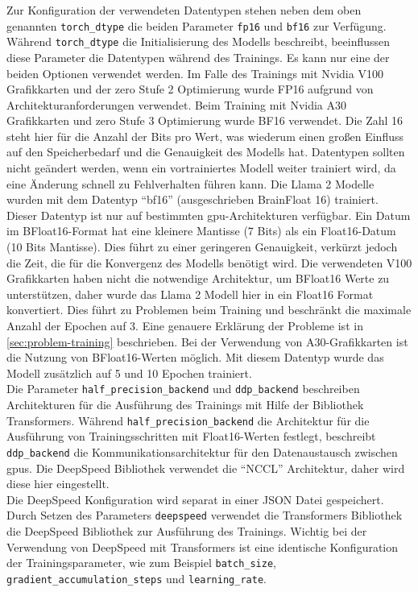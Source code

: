 Zur Konfiguration der verwendeten Datentypen stehen neben dem oben genannten \texttt{torch\_dtype} die beiden Parameter \texttt{fp16} und \texttt{bf16} zur Verfügung. Während \texttt{torch\_dtype} die Initialisierung des Modells beschreibt, beeinflussen diese Parameter die Datentypen während des Trainings.
Es kann nur eine der beiden Optionen verwendet werden. Im Falle des Trainings mit Nvidia V100 Grafikkarten und der \ac{zero} Stufe 2 Optimierung wurde FP16 aufgrund von Architekturanforderungen verwendet. Beim Training mit Nvidia A30 Grafikkarten und \ac{zero} Stufe 3 Optimierung wurde BF16 verwendet.
Die Zahl 16 steht hier für die Anzahl der Bits pro Wert, was wiederum einen großen Einfluss auf den Speicherbedarf und die Genauigkeit des Modells hat.
Datentypen sollten nicht geändert werden, wenn ein vortrainiertes Modell weiter trainiert wird, da eine Änderung schnell zu Fehlverhalten führen kann.
Die Llama 2 Modelle wurden mit dem Datentyp \enquote{bf16} (ausgeschrieben BrainFloat 16) trainiert.
Dieser Datentyp ist nur auf bestimmten \ac{gpu}-Architekturen verfügbar.
Ein Datum im BFloat16-Format hat eine kleinere Mantisse (7 Bits) als ein Float16-Datum (10 Bits Mantisse). Dies führt zu einer geringeren Genauigkeit, verkürzt jedoch die Zeit, die für die Konvergenz des Modells benötigt wird.
Die verwendeten V100 Grafikkarten haben nicht die notwendige Architektur, um BFloat16 Werte zu unterstützen, daher wurde das Llama 2 Modell hier in ein Float16 Format konvertiert.
Dies führt zu Problemen beim Training und beschränkt die maximale Anzahl der Epochen auf 3. Eine genauere Erklärung der Probleme ist in \cref{sec:problem-training} beschrieben.
Bei der Verwendung von A30-Grafikkarten ist die Nutzung von BFloat16-Werten möglich. Mit diesem Datentyp wurde das Modell zusätzlich auf 5 und 10 Epochen trainiert.\\

Die Parameter \texttt{half\_precision\_backend} und \texttt{ddp\_backend} beschreiben Architekturen für die Ausführung des Trainings mit Hilfe der Bibliothek Transformers.
Während \texttt{half\_precision\_backend} die Architektur für die Ausführung von Trainingsschritten mit Float16-Werten festlegt, beschreibt \texttt{ddp\_backend} die Kommunikationsarchitektur für den Datenaustausch zwischen \ac{gpu}s.
Die DeepSpeed Bibliothek verwendet die \enquote{NCCL} Architektur, daher wird diese hier eingestellt.\\

Die DeepSpeed Konfiguration wird separat in einer JSON Datei gespeichert.
Durch Setzen des Parameters \texttt{deepspeed} verwendet die Transformers Bibliothek \citep{transformers} die DeepSpeed Bibliothek \citep{deepspeed} zur Ausführung des Trainings.
Wichtig bei der Verwendung von DeepSpeed mit Transformers ist eine identische Konfiguration der Trainingsparameter, wie zum Beispiel \texttt{batch\_size}, \texttt{gradient\_accumulation\_steps} und \texttt{learning\_rate}.\\

